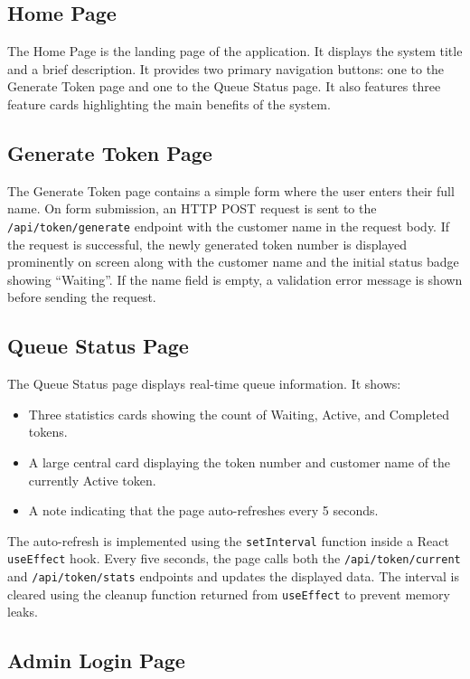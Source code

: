 \subsection{Home Page}

The Home Page is the landing page of the application. It displays the system title and a brief description. It provides two primary navigation buttons: one to the Generate Token page and one to the Queue Status page. It also features three feature cards highlighting the main benefits of the system.

\subsection{Generate Token Page}

The Generate Token page contains a simple form where the user enters their full name. On form submission, an HTTP POST request is sent to the \texttt{/api/token/generate} endpoint with the customer name in the request body. If the request is successful, the newly generated token number is displayed prominently on screen along with the customer name and the initial status badge showing ``Waiting''. If the name field is empty, a validation error message is shown before sending the request.

\subsection{Queue Status Page}

The Queue Status page displays real-time queue information. It shows:
\begin{itemize}
    \item Three statistics cards showing the count of Waiting, Active, and Completed tokens.
    \item A large central card displaying the token number and customer name of the currently Active token.
    \item A note indicating that the page auto-refreshes every 5 seconds.
\end{itemize}

The auto-refresh is implemented using the \texttt{setInterval} function inside a React \texttt{useEffect} hook. Every five seconds, the page calls both the \texttt{/api/token/current} and \texttt{/api/token/stats} endpoints and updates the displayed data. The interval is cleared using the cleanup function returned from \texttt{useEffect} to prevent memory leaks.

\subsection{Admin Login Page}

